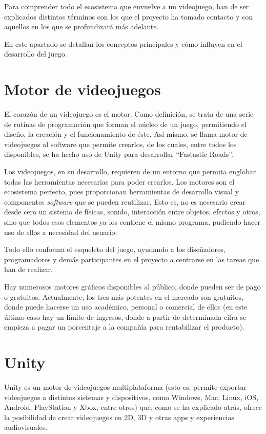 Para comprender todo el ecosistema que envuelve a un videojuego, han de ser explicados distintos términos con los que el proyecto ha tomado contacto y con aquellos en los que se profundizará más adelante.

En este apartado se detallan los conceptos principales y cómo influyen en el desarrollo del juego.

\section{Motor de videojuegos}

El corazón de un videojuego es el motor. Como definición, se trata de una serie de rutinas de programación que forman el núcleo de un juego, permitiendo el diseño, la creación y el funcionamiento de éste. Así mismo, se llama motor de videojuegos al software que permite crearlos, de los cuales, entre todos los disponibles, se ha hecho uso de Unity para desarrollar ``Fastastic Roads''.

Los videojuegos, en su desarrollo, requieren de un entorno que permita englobar todas las herramientas necesarias para poder crearlos. Los motores son el ecosistema perfecto, pues proporcionan herramientas de desarrollo visual y componentes \textit{software} que se pueden reutilizar. Esto es, no es necesario crear desde cero un sistema de físicas, sonido, interacción entre objetos, efectos y otros, sino que todos esos elementos ya los contiene el mismo programa, pudiendo hacer uso de ellos a necesidad del usuario. 

Todo ello conforma el esqueleto del juego, ayudando a los diseñadores, programadores y demás participantes en el proyecto a centrarse en las tareas que han de realizar.

Hay numerosos motores gráficos disponibles al público, donde pueden ser de pago o gratuitos. Actualmente, los tres más potentes en el mercado son gratuitos, donde puede hacerse un uso académico, personal o comercial de ellos (en este último caso hay un límite de ingresos, donde a partir de determinada cifra se empieza a pagar un porcentaje a la compañía para rentabilizar el producto).

\section{Unity}

Unity es un motor de videojuegos multiplataforma (esto es, permite exportar videojuegos a distintos sistemas y dispositivos, como Windows, Mac, Linux, iOS, Android, PlayStation y Xbox, entre otros) que, como se ha explicado atrás, ofrece la posibilidad de crear videojuegos en 2D, 3D y otras apps y experiencias audiovisuales.


